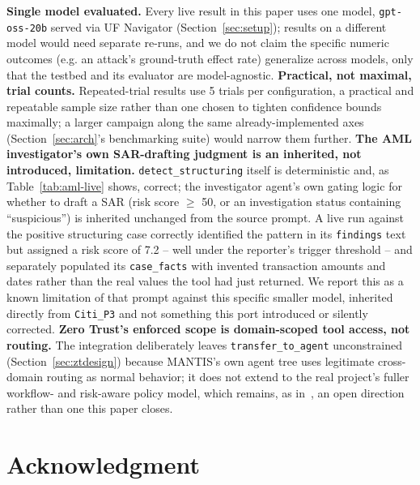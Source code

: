 \documentclass[conference]{IEEEtran}
\begin{document}
\textbf{Single model evaluated.} Every live result in this paper uses one model, \texttt{gpt-oss-20b} served via UF Navigator (Section~\ref{sec:setup}); results on a different model would need separate re-runs, and we do not claim the specific numeric outcomes (e.g. an attack's ground-truth effect rate) generalize across models, only that the testbed and its evaluator are model-agnostic. \textbf{Practical, not maximal, trial counts.} Repeated-trial results use 5 trials per configuration, a practical and repeatable sample size rather than one chosen to tighten confidence bounds maximally; a larger campaign along the same already-implemented axes (Section~\ref{sec:arch}'s benchmarking suite) would narrow them further. \textbf{The AML investigator's own SAR-drafting judgment is an inherited, not introduced, limitation.} \texttt{detect\_structuring} itself is deterministic and, as Table~\ref{tab:aml-live} shows, correct; the investigator agent's own gating logic for whether to draft a SAR (risk score $\geq$ 50, or an investigation status containing ``suspicious'') is inherited unchanged from the source prompt. A live run against the positive structuring case correctly identified the pattern in its \texttt{findings} text but assigned a risk score of 7.2 -- well under the reporter's trigger threshold -- and separately populated its \texttt{case\_facts} with invented transaction amounts and dates rather than the real values the tool had just returned. We report this as a known limitation of that prompt against this specific smaller model, inherited directly from \texttt{Citi\_P3} and not something this port introduced or silently corrected. \textbf{Zero Trust's enforced scope is domain-scoped tool access, not routing.} The integration deliberately leaves \texttt{transfer\_to\_agent} unconstrained (Section~\ref{sec:ztdesign}) because MANTIS's own agent tree uses legitimate cross-domain routing as normal behavior; it does not extend to the real project's fuller workflow- and risk-aware policy model, which remains, as in~\cite{mantis_paper2}, an open direction rather than one this paper closes.

\section*{Acknowledgment}
\end{document}
